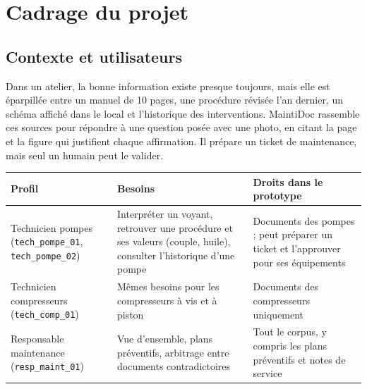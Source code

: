 \documentclass[11pt,a4paper]{article}
\begin{document}
\section{Cadrage du projet}
\subsection{Contexte et utilisateurs}
Dans un atelier, la bonne information existe presque toujours, mais elle est éparpillée entre un manuel de 10 pages, une procédure révisée l'an dernier, un schéma affiché dans le local et l'historique des interventions. MaintiDoc rassemble ces sources pour répondre à une question posée avec une photo, en citant la page et la figure qui justifient chaque affirmation. Il prépare un ticket de maintenance, mais seul un humain peut le valider.

\begin{center}
\begin{tabularx}{\linewidth}{L{3.1cm}X X}
\toprule
\textbf{Profil} & \textbf{Besoins} & \textbf{Droits dans le prototype}\\\midrule
Technicien pompes (\texttt{tech\_pompe\_01}, \texttt{tech\_pompe\_02}) & Interpréter un voyant, retrouver une procédure et ses valeurs (couple, huile), consulter l'historique d'une pompe & Documents des pompes ; peut préparer un ticket et l'approuver pour ses équipements\\
Technicien compresseurs (\texttt{tech\_comp\_01}) & Mêmes besoins pour les compresseurs à vis et à piston & Documents des compresseurs uniquement\\
Responsable maintenance (\texttt{resp\_maint\_01}) & Vue d'ensemble, plans préventifs, arbitrage entre documents contradictoires & Tout le corpus, y compris les plans préventifs et notes de service\\
\bottomrule
\end{tabularx}
\end{center}
\end{document}
